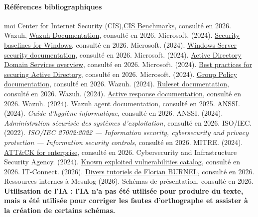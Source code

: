 \documentclass[a4paper, 11pt]{article}
\begin{document}
\paragraph*{Références bibliographiques}
 \begin{thebibliography}{moi}
\bibitem{[1]} Center for Internet Security (CIS),\href{https://www.cisecurity.org/cis-benchmarks/}{CIS Benchmarks}, consulté en 2026.
\bibitem{[2]} Wazuh, \href{https://documentation.wazuh.com/}{Wazuh Documentation}, consulté en 2026.
\bibitem{[3]} Microsoft. (2024). \href{https://learn.microsoft.com/en-us/windows/security/threat-protection/windows-security-configuration-framework/security-baselines}{Security baselines for Windows}, consulté en 2026.
\bibitem{[4]} Microsoft. (2024). \href{https://learn.microsoft.com/en-us/windows-server/security/}{Windows Server security documentation}, consulté en 2026.
\bibitem{[5]} Microsoft. (2024). \href{https://learn.microsoft.com/en-us/windows-server/identity/ad-ds/get-started/virtual-dc/active-directory-domain-services-overview}{Active Directory Domain Services overview}, consulté en 2026.
\bibitem{[6]} Microsoft. (2024). \href{https://learn.microsoft.com/en-us/windows-server/identity/ad-ds/plan/security-best-practices/active-directory-security-best-practices}{Best practices for securing Active Directory}, consulté en 2026.
\bibitem{[7]} Microsoft. (2024). \href{https://learn.microsoft.com/en-us/windows-server/administration/windows-commands/group-policy-objects}{Group Policy documentation}, consulté en 2026.
\bibitem{[8]} Wazuh. (2024). \href{https://documentation.wazuh.com/current/user-manual/ruleset/index.html}{Ruleset documentation}, consulté en 2026.
\bibitem{[9]} Wazuh. (2024). \href{https://documentation.wazuh.com/current/user-manual/capabilities/active-response/index.html}{Active response documentation}, consulté en 2026.
\bibitem{[10]} Wazuh. (2024). \href{https://documentation.wazuh.com/current/user-manual/agents/index.html}{Wazuh agent documentation}, consulté en 2025.
\bibitem{[11]} ANSSI. (2024). \textit{Guide d’hygiène informatique}, consulté en 2026.
\bibitem{[12]} ANSSI. (2024). \textit{Administration sécurisée des systèmes d’exploitation}, consulté en 2026.
\bibitem{[13]} ISO/IEC. (2022). \textit{ISO/IEC 27002:2022 — Information security, cybersecurity and privacy protection — Information security controls}, consulté en 2026.
\bibitem{[14]} MITRE. (2024). \href{https://attack.mitre.org/}{ATT\&CK for enterprise}, consulté en 2026.
\bibitem{[15]} Cybersecurity and Infrastructure Security Agency. (2024). \href{https://www.cisa.gov/known-exploited-vulnerabilities-catalog}{Known exploited vulnerabilities catalog}, consulté en 2026.
\bibitem{[16]} IT-Connect. (2026). \href{https://www.it-connect.fr/}{Divers tutoriels de Florian BURNEL}, consulté en 2026.
\\
\bibitem{[17]} Ressources internes à Mesulog (2026). Schémas de présentation, consulté en 2026.
\bibitem{[18]} \textbf{Utilisation de l'IA : l'IA n'a pas été utilisée pour produire du texte, mais a été utilisée pour corriger les fautes d'orthographe et assister à la création de certains schémas.}

\end{thebibliography}

\end{document}
